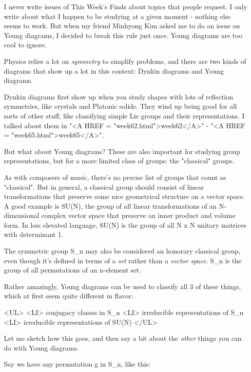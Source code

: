 


I never write issues of This Week's Finds about topics that people
request.  I only write about what I happen to be studying at a given
moment - nothing else seems to work.  But when my friend Minhyong Kim
asked me to do an issue on Young diagrams, I decided to break this 
rule just once.  Young diagrams are too cool to ignore.

Physics relies a lot on \emph{symmetry} to simplify problems, and there are 
two kinds of diagrams that show up a lot in this context: Dynkin diagrams 
and Young diagrams.  

Dynkin diagrams first show up when you study shapes with lots of
reflection symmetries, like crystals and Platonic solids.  They wind up
being good for all sorts of other stuff, like classifying simple Lie
groups and their representations.  I talked about them in "<A HREF
= "week62.html">week62</A>" - "<A HREF =
"week65.html">week65</A>".

But what about Young diagrams?  These are also important for studying
group representations, but for a more limited class of groups: the
"classical" groups.

As with composers of music, there's no precise list of groups that count
as "classical".  But in general, a classical group should consist of
linear transformations that preserve some nice geometrical structure on
a vector space.  A good example is SU(N), the group of all linear
transformations of an N-dimensional complex vector space that preserve
an inner product and volume form.  In less elevated language, SU(N) is
the group of all N x N unitary matrices with determinant 1.

The symmetric group S_{n} may also be considered an honorary classical
group, even though it's defined in terms of a \emph{set} rather than a
\emph{vector space}.  
S_{n} is the group of all permutations of an n-element
set.  

Rather amazingly, Young diagrams can be used to classify all 3 of
these things, which at first seem quite different in flavor:

<UL>
<LI> conjugacy classes in S_{n}
<LI> irreducible representations of S_{n}
<LI> irreducible representations of SU(N)
</UL>

Let me sketch how this goes, and then say a bit about the \emph{other}
things you can do with Young diagrams.

Say we have any permutation g in S_{n}, like this:


